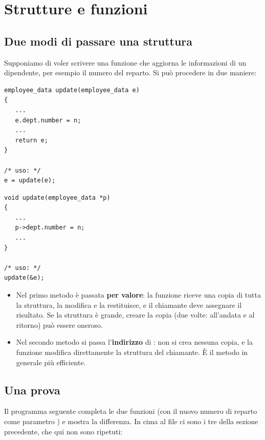\section{Strutture e funzioni}

\subsection{Due modi di passare una struttura}

Supponiamo di voler scrivere una funzione che aggiorna le informazioni di un
dipendente, per esempio il numero del reparto. Si può procedere in due
maniere:

\begin{affianco}[0.5][c]
\begin{lstlisting}[style=c]
employee_data update(employee_data e)
{
   ...
   e.dept.number = n;
   ...
   return e;
}

/* uso: */
e = update(e);
\end{lstlisting}
\risultato
\begin{lstlisting}[style=c]
void update(employee_data *p)
{
   ...
   p->dept.number = n;
   ...
}

/* uso: */
update(&e);
\end{lstlisting}
\end{affianco}

\begin{itemize}
  \item Nel primo metodo  è passata \textbf{per valore}: la funzione
        riceve una copia di tutta la struttura, la modifica e la restituisce,
        e il chiamante deve assegnare il risultato. Se la struttura è grande,
        creare la copia (due volte: all'andata e al ritorno) può essere
        oneroso.
  \item Nel secondo metodo si passa l'\textbf{indirizzo} di : non si
        crea nessuna copia, e la funzione modifica direttamente la struttura
        del chiamante. È il metodo in generale più efficiente.
\end{itemize}

\subsection{Una prova}

Il programma seguente completa le due funzioni (con il nuovo numero di
reparto come parametro ) e mostra la differenza. In cima al file ci
sono i tre  della sezione precedente, che qui non sono
ripetuti:

